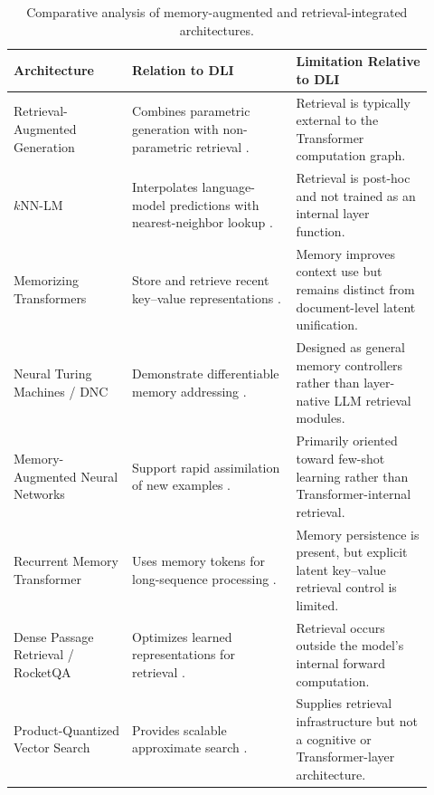 \begin{table}[H]
\centering
\footnotesize

\setlength{\tabcolsep}{2pt}
\renewcommand{\arraystretch}{0.95}
\setlength{\abovecaptionskip}{4pt}
\setlength{\belowcaptionskip}{0pt}

\begin{tabular}{
    p{0.26\linewidth}
    p{0.36\linewidth}
    p{0.30\linewidth}
}
\hline

\textbf{Architecture}
&
\textbf{Relation to DLI}
&
\textbf{Limitation Relative to DLI}
\\
\hline

Retrieval-Augmented Generation
&
Combines parametric generation with non-parametric retrieval
\cite{Lewis2021}.
&
Retrieval is typically external to the Transformer computation graph.
\\
\hline

$k$NN-LM
&
Interpolates language-model predictions with nearest-neighbor lookup
\cite{Khandelwal2020}.
&
Retrieval is post-hoc and not trained as an internal layer function.
\\
\hline

Memorizing Transformers
&
Store and retrieve recent key--value representations
\cite{Wu2022}.
&
Memory improves context use but remains distinct from document-level
latent unification.
\\
\hline

Neural Turing Machines / DNC
&
Demonstrate differentiable memory addressing
\cite{Graves2014, Graves2016}.
&
Designed as general memory controllers rather than layer-native
LLM retrieval modules.
\\
\hline

Memory-Augmented Neural Networks
&
Support rapid assimilation of new examples
\cite{Santoro2016}.
&
Primarily oriented toward few-shot learning rather than
Transformer-internal retrieval.
\\
\hline

Recurrent Memory Transformer
&
Uses memory tokens for long-sequence processing
\cite{Bulatov2022}.
&
Memory persistence is present, but explicit latent key--value
retrieval control is limited.
\\
\hline

Dense Passage Retrieval / RocketQA
&
Optimizes learned representations for retrieval
\cite{Qu2021}.
&
Retrieval occurs outside the model's internal forward computation.
\\
\hline

Product-Quantized Vector Search
&
Provides scalable approximate search
\cite{Jgou2011, Johnson2021}.
&
Supplies retrieval infrastructure but not a cognitive or
Transformer-layer architecture.
\\
\hline

\end{tabular}

\caption{Comparative analysis of memory-augmented and retrieval-integrated architectures.}
\label{tab:comparative-architectures}

\end{table}

